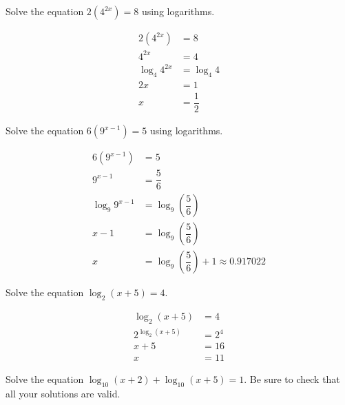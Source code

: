 \documentclass[11pt,letterpaper]{article}
\begin{document}

 Solve the equation $2(4^{2x})= 8$ using logarithms. \pspace

\sol
	\[
	\begin{aligned}
	2(4^{2x})&= 8 \\[0.3cm]
	4^{2x}&= 4 \\[0.3cm] 
	\log_4 4^{2x}&= \log_4 4 \\[0.3cm]
	2x&= 1 \\[0.3cm]
	x&= \dfrac{1}{2}
	\end{aligned}
	\]





\newpage





 Solve the equation $6(9^{x-1})= 5$ using logarithms. \pspace

\sol
	\[
	\begin{aligned}
	6(9^{x-1})&= 5 \\[0.3cm]
	9^{x - 1}&= \dfrac{5}{6} \\[0.3cm]
	\log_9 9^{x - 1}&= \log_9 \left( \dfrac{5}{6} \right) \\[0.3cm]
	x - 1&= \log_9 \left( \dfrac{5}{6} \right) \\[0.3cm]
	x&= \log_9 \left( \dfrac{5}{6} \right) + 1 \approx 0.917022
	\end{aligned}
	\]





\newpage





 Solve the equation $\log_2(x + 5)= 4$. \pspace

\sol
	\[
	\begin{aligned}
	\log_2(x + 5)&= 4 \\[0.3cm]
	2^{\log_2(x + 5)}&= 2^4 \\[0.3cm]
	x + 5&= 16 \\[0.3cm]
	x&= 11
	\end{aligned}
	\]





\newpage





 Solve the equation $\log_{10}(x + 2) + \log_{10}(x + 5)= 1$. Be sure to check that all your solutions are valid. \pspace
\end{document}
